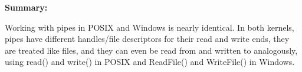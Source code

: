 \documentclass[letterpaper,10pt,titlepage]{article}
\newcommand{\tab}{\hspace*{2em}} %
\begin{document}
\begin{enumerate}
\textbf{Summary:} \newline

\tab Working with pipes in POSIX and Windows is nearly identical. In both kernels, pipes have different handles/file descriptors for their read and write ends, they are treated like files, and they can even be read from and written to analogously, using read() and write() in POSIX and ReadFile() and WriteFile() in Windows.

\end{enumerate}

%
\end{document}

